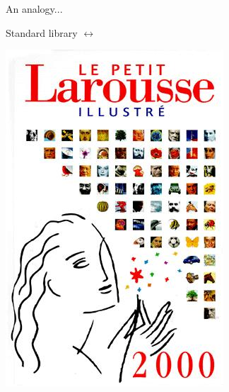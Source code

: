 \documentclass[10pt]{beamer}
\newenvironment{slide}[2][]
  {\begin{frame}[fragile,environment=slide,#1]{#2}}
  {\end{frame}}
\begin{document}
\begin{slide}{An analogy...}
\begin{center}
\begin{minipage}{0.45\textwidth}
\Large
Standard library $\longleftrightarrow$
\end{minipage}
\begin{minipage}{0.45\textwidth}
\vspace{10pt}
\includegraphics[width=\textwidth]{figures/larousse.jpg}
\end{minipage}
\end{center}
\end{slide}
\end{document}
